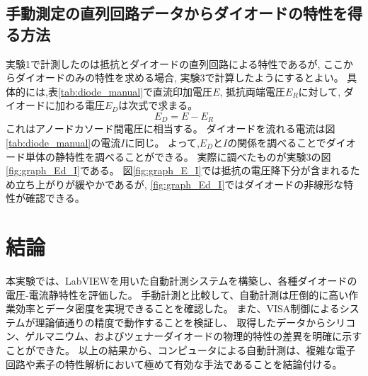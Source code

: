 \subsection{手動測定の直列回路データからダイオードの特性を得る方法}
実験1で計測したのは抵抗とダイオードの直列回路による特性であるが, 
ここからダイオードのみの特性を求める場合, 実験3で計算したようにするとよい。
具体的には,表\ref{tab:diode_manual}で直流印加電圧$E$, 抵抗両端電圧$E_R$に対して, ダイオードに加わる電圧$E_D$は次式で求まる。
\begin{equation}
    E_D = E - E_R
\end{equation}
これはアノードカソード間電圧に相当する。
ダイオードを流れる電流は図\ref{tab:diode_manual}の電流$I$に同じ。
よって,$E_D$と$I$の関係を調べることでダイオード単体の静特性を調べることができる。
実際に調べたものが実験3の図\ref{fig:graph_Ed_I}である。
図\ref{fig:graph_E_I}では抵抗の電圧降下分が含まれるため立ち上がりが緩やかであるが, 
\ref{fig:graph_Ed_I}ではダイオードの非線形な特性が確認できる。


\section{結論}
本実験では、LabVIEWを用いた自動計測システムを構築し、各種ダイオードの電圧-電流静特性を評価した。
手動計測と比較して、自動計測は圧倒的に高い作業効率とデータ密度を実現できることを確認した。
また、VISA制御によるシステムが理論値通りの精度で動作することを検証し、
取得したデータからシリコン、ゲルマニウム、およびツェナーダイオードの物理的特性の差異を明確に示すことができた。
以上の結果から、コンピュータによる自動計測は、複雑な電子回路や素子の特性解析において極めて有効な手法であることを結論付ける。